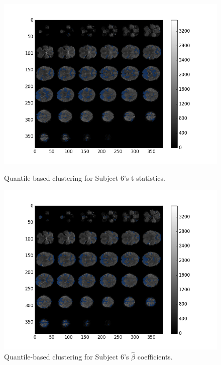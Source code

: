 \begin{figure}[ht]
\centering
\begin{minipage}[b]{0.45\linewidth}
	\centering
	\includegraphics[width=.8\linewidth]{../images/sub006_t_overlay.png} 
	\caption{Quantile-based clustering for Subject 6's t-statistics.}
	\label{fig:clustert}
\end{minipage}	

\begin{minipage}[b]{0.45\linewidth}
	\centering
		\includegraphics[width=.8\linewidth]{../images/sub006_beta_overlay.png} 
	\caption{Quantile-based clustering for Subject 6's $\hat{\beta}$ coefficients.}
	\label{fig:clusterbeta}
\end{minipage}


\end{figure}
